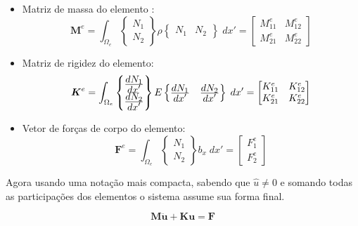 \begin{itemize}
    \item Matriz de massa do elemento : \begin{equation} \boldsymbol{M}^e = \int_{\Omega_e} \begin{Bmatrix} N_1 \\ N_2 \end{Bmatrix} \rho \begin{Bmatrix} N_1 & N_2 \end{Bmatrix} \; dx' = \begin{bmatrix} M^e_{11} & M^e_{12} \\ M^e_{21} & M^e_{22} \end{bmatrix} \end{equation} 
    \item Matriz de rigidez do elemento: \begin{equation}
        \boldsymbol{K}^e = \int_{\Omega_e} \begin{Bmatrix} \frac{\displaystyle dN_1}{\displaystyle dx'} \\ \frac{\displaystyle dN_2}{\displaystyle dx'}  \end{Bmatrix} E \begin{Bmatrix} \frac{\displaystyle dN_1}{\displaystyle dx'}  & \frac{\displaystyle dN_2}{\displaystyle dx'}  \end{Bmatrix} \; dx' = \begin{bmatrix} K^e_{11} & K^e_{12} \\ K^e_{21} & K^e_{22} \end{bmatrix}
    \end{equation}
    
    \item Vetor de forças de corpo do elemento: 
    \begin{equation}
        \boldsymbol{F}^e = \int_{\Omega_e} \begin{Bmatrix} N_1 \\ N_2  \end{Bmatrix} b_x \; dx' = \begin{bmatrix} F^e_1 \\ F^e_2 \end{bmatrix}
    \end{equation}
\end{itemize}

Agora usando uma notação mais compacta, sabendo que  $ \hat{u} \neq 0 $ e somando todas as participações dos elementos o sistema assume sua forma final.

\begin{equation} \label{eq:formafindiscesp}
    \boldsymbol{M \ddot{u} } + \boldsymbol{Ku} = \boldsymbol{F}
\end{equation}

